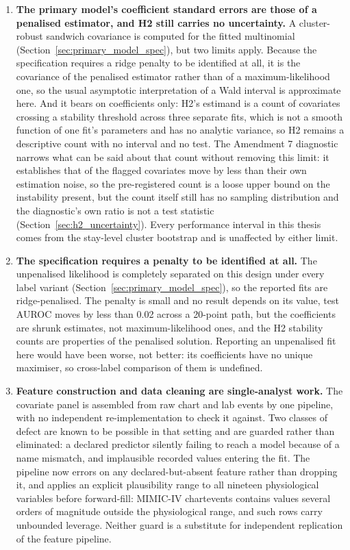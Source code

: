 \begin{enumerate}
    \item \textbf{The primary model's coefficient standard errors are those
    of a penalised estimator, and H2 still carries no uncertainty.} A
    cluster-robust sandwich covariance is computed for the fitted multinomial
    (Section~\ref{sec:primary_model_spec}), but two limits apply. Because the
    specification requires a ridge penalty to be identified at all, it is the
    covariance of the penalised estimator rather than of a maximum-likelihood
    one, so the usual asymptotic interpretation of a Wald interval is
    approximate here. And it bears on coefficients only: H2's estimand is a
    count of covariates crossing a stability threshold across three separate
    fits, which is not a smooth function of one fit's parameters and has no
    analytic variance, so H2 remains a descriptive count with no interval and no
    test. The Amendment 7 diagnostic narrows what can be said about that count
    without removing this limit: it establishes that
    \pcHTwoNNoise{} of the \pcHTwoNFlagged{} flagged covariates move by less
    than their own estimation noise, so the pre-registered count is a loose
    upper bound on the instability present, but the count itself still has no
    sampling distribution and the diagnostic's own ratio is not a test statistic
    (Section~\ref{sec:h2_uncertainty}). Every performance interval in this
    thesis comes from the stay-level cluster bootstrap and is unaffected by
    either limit.

    \item \textbf{The specification requires a penalty to be identified at all.}
    The unpenalised likelihood is completely separated on this design under
    every label variant (Section~\ref{sec:primary_model_spec}), so the reported
    fits are ridge-penalised. The penalty is small and no result depends on its
    value, test AUROC moves by less than 0.02 across a 20-point path, but
    the coefficients are shrunk estimates, not maximum-likelihood ones, and the
    H2 stability counts are properties of the penalised solution. Reporting an
    unpenalised fit here would have been worse, not better: its coefficients
    have no unique maximiser, so cross-label comparison of them is undefined.

    \item \textbf{Feature construction and data cleaning are single-analyst
    work.} The covariate panel is assembled from raw chart and lab events by
    one pipeline, with no independent re-implementation to check it against.
    Two classes of defect are known to be possible in that setting and are
    guarded rather than eliminated: a declared predictor silently failing to
    reach a model because of a name mismatch, and implausible recorded values
    entering the fit. The pipeline now errors on any declared-but-absent
    feature rather than dropping it, and applies an explicit plausibility range
    to all nineteen physiological variables before forward-fill: MIMIC-IV
    chartevents contains values several orders of magnitude outside the
    physiological range, and such rows carry unbounded leverage. Neither guard
    is a substitute for independent replication of the feature pipeline.


\end{enumerate}
